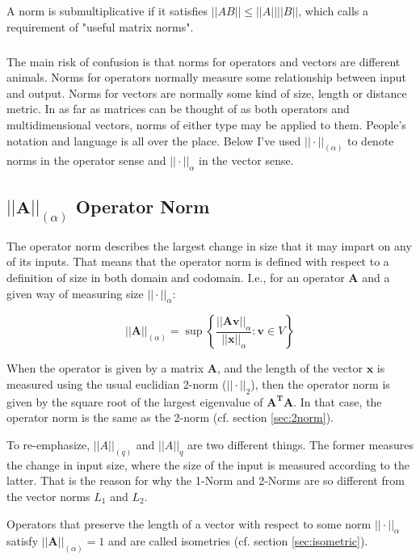 A norm is submultiplicative if it satisfies $||AB||\leq||A||||B||$, which  calls a requirement of "useful matrix norms".

\subparagraph{} 
The main risk of confusion is that norms for operators and vectors are different animals. Norms for operators normally measure some relationship between input and output. Norms for vectors are normally some kind of size, length or distance metric. In as far as matrices can be thought of as both operators and multidimensional vectors, norms of either type may be applied to them. People's notation and language is all over the place. Below I've used $||\cdot||_{(\alpha)}$ to denote norms in the operator sense and $||\cdot||_{\alpha}$ in the vector sense. 

\subsection{$||\mathbf{A}||_{(\alpha)}$ Operator Norm}
\label{sec:operatornorm}
The operator norm describes the largest change in size that it may impart on any of its inputs. That means that the operator norm is defined with respect to a definition of size in both domain and codomain. I.e., for an operator $\mathbf{A}$ and a given way of measuring size $||\cdot||_{\alpha}$:

\begin{equation}
||\mathbf{A}||_{(\alpha)} = \sup\left\{\frac{||\mathbf{A}\mathbf{v}||_{\alpha}}{||\mathbf{x}||_{\alpha}}: \mathbf{v} \in V\right\}
\end{equation}

When the operator is given by a matrix $\mathbf{A}$, and the length of the vector $\mathbf{x}$ is measured using the usual euclidian 2-norm ($||\cdot||_{2}$), then the operator norm is given by the square root of the largest eigenvalue of $\mathbf{A^T A}$. In that case, the operator norm is the same as the 2-norm (cf. section \ref{sec:2norm}).

To re-emphasize, $||A||_{(q)}$ and $||A||_q$ are two different things. The former measures the change in input size, where the size of the input is measured according to the latter. That is the reason for why the 1-Norm and 2-Norms are so different from the vector norms $L_1$ and $L_2$.

Operators that preserve the length of a vector with respect to some norm $||\cdot||_{\alpha}$ satisfy $||\mathbf{A}||_{(\alpha)} = 1$ and are called isometries (cf. section \ref{sec:isometric}). 

